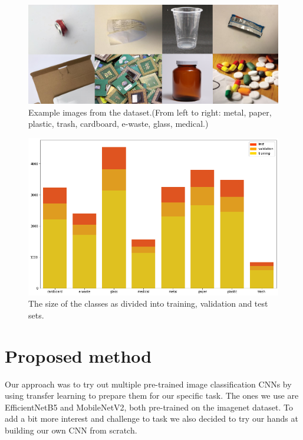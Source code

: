 \documentclass[twocolumn]{article}
\begin{document}
	\begin{figure}[h]
		\centering
		\includegraphics[width=\linewidth]{dataset_images.png}
		\caption{Example images from the dataset.(From left to right: metal, paper, plastic, trash, cardboard, e-waste, glass, medical.)}
		\label{dataset_images}
	\end{figure}
	
	\begin{figure}[h]
		\centering
		\includegraphics[width=\linewidth]{dataset.png}
		\caption{The size of the classes as divided into training, validation and test sets.}
		\label{dataset}
	\end{figure}
	
	\section{Proposed method}
	
	Our approach was to try out multiple pre-trained image classification CNNs by using transfer learning to prepare them for our specific task. The ones we use are EfficientNetB5 and MobileNetV2, both pre-trained on the imagenet dataset. To add a bit more interest and challenge to task we also decided to try our hands at building our own CNN from scratch.
	
\end{document}
